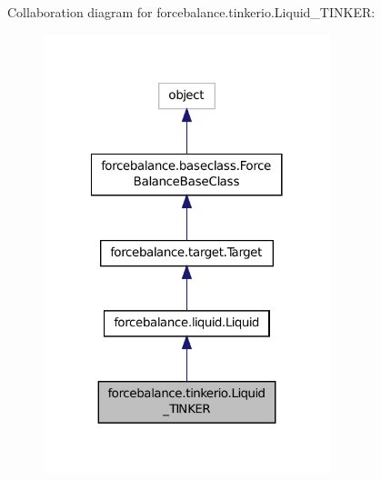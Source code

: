 Collaboration diagram for forcebalance.\-tinkerio.\-Liquid\-\_\-\-T\-I\-N\-K\-E\-R\-:
\nopagebreak
\begin{figure}[H]
\begin{center}
\leavevmode
\includegraphics[width=236pt]{classforcebalance_1_1tinkerio_1_1Liquid__TINKER__coll__graph}
\end{center}
\end{figure}
